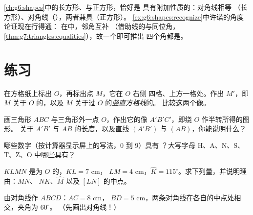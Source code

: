 \begin{remark}[特殊的平行四边形]
\cref{ch:g6:shapes}中的长方形、与正方形，恰好是
具有附加性质的：对角线相等
（长方形）、对角线（），两者兼具（正方形）。
\cref{ex:g6:shapes:recognize}中许诺的角度论证现在行得通：
在中，邻角互补
（借助线的与同位角，
\cref{thm:g7:triangles:equalities}），故一个即可推出
四个角都是。
\end{remark}

\section{练习}

\begin{exercise}[$\star$]\label{exo:g7:central:1}
在方格纸上标出 $O$，再标出点 $M$，它在 $O$ 右侧
四格、上方一格处。作出 $M'$，即 $M$ 关于 $O$ 的，以及
$M$ 关于过 $O$ 的\emph{竖直方格线}的。
比较这两个像。
\end{exercise}

\begin{exercise}[$\star$]\label{exo:g7:central:2}
画三角形 $ABC$ 与三角形外一点 $O$，作出它的像
$A'B'C'$，即绕 $O$ 作半转所得的图形。
关于 $A'B'$ 与 $AB$ 的长度，以及直线 $(A'B')$ 与 $(AB)$，你能说明什么？
\end{exercise}

\begin{exercise}[$\star$]\label{exo:g7:central:3}
哪些数字（按计算器显示屏上的写法，$0$ 到 $9$）具有
？大写字母 H、A、N、S、T、Z、O 中哪些具有？
\end{exercise}

\begin{exercise}[$\star$]\label{exo:g7:central:4}
$KLMN$ 是为 $O$ 的，$KL = 7$ cm，
$LM = 4$ cm，$\widehat K = 115^\circ$。求下列量，并说明理由：$MN$、
$NK$、$\widehat M$ 以及 $[LN]$ 的中点。
\end{exercise}

\begin{exercise}[$\star$]\label{exo:g7:central:5}
由对角线作 $ABCD$：$AC = 8$ cm，
$BD = 5$ cm，两条对角线在各自的中点处相交，夹角为 $60^\circ$。
（先画出对角线！）
\end{exercise}

